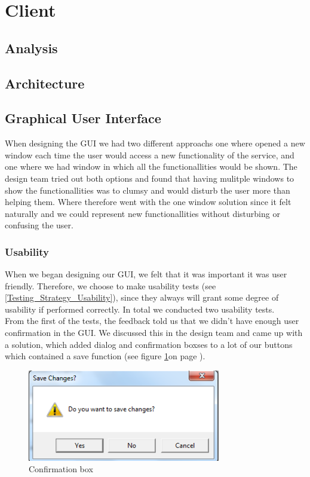 \section{Client}
\label{Design_Client}

\subsection{Analysis}
\label{Design_Client_Analysis}

\subsection{Architecture}
\label{Design_Client_Architecture}

\subsection{Graphical User Interface}
\label{Design_Client_GUI}
When designing the GUI we had two different approachs one where opened a new window each time the user would access a new functionality of the service, and one where we had window in which all the functionallities would be shown. The design team tried out both options and found that having mulitple windows to show the functionallities was to clumsy and would disturb the user more than helping them. Where therefore went with the one window solution since it felt naturally and we could represent new functionallities without disturbing or confusing the user.

\subsubsection{Usability}
\label{Design_Client_GUI_Usability}
When we began designing our GUI, we felt that it was important it was user friendly. Therefore, we choose to make usability tests (see \ref{Testing_Strategy_Usability}), since they always will grant some degree of usability if performed correctly. In total we conducted two usability tests.
\\From the first of the tests, the feedback told us that we didn't have enough user confirmation in the GUI. We discussed this in the design team and came up with a solution, which added dialog and confirmation boxses to a lot of our buttons which contained a save function (see figure \ref{fig:Design_Client_GUI_Usability_popup}on page \pageref{fig:Design_Client_GUI_Usability_popup}).

\begin{figure}[h!]
\caption{Confirmation box}
\label{fig:Design_Client_GUI_Usability_popup}
  \centering
\includegraphics[width=0.75\textwidth]{Parts/Images/Design/Confirmationbox}
\end{figure}

